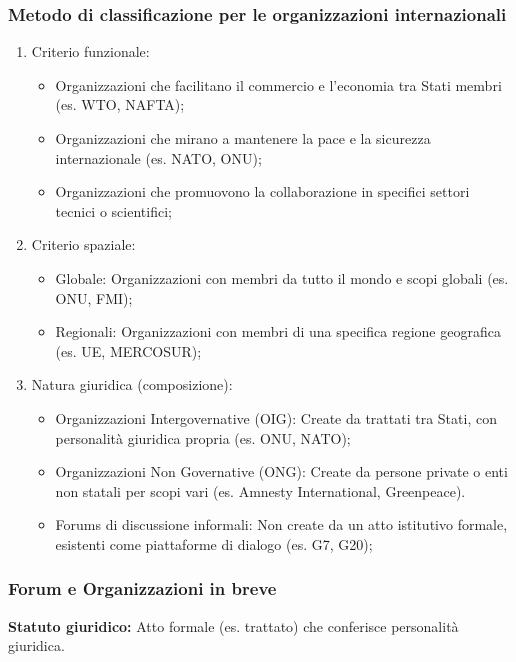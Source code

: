 \documentclass{article}
\begin{document}
\subsubsection{Metodo di classificazione per le organizzazioni internazionali}
\begin{enumerate}
    \item Criterio funzionale:
        \begin{itemize}
            \item Organizzazioni che facilitano il commercio e l'economia tra Stati membri
                (es. WTO, NAFTA);
            \item Organizzazioni che mirano a mantenere la pace e la sicurezza internazionale
                (es. NATO, ONU);
            \item Organizzazioni che promuovono la collaborazione in specifici settori tecnici
                o scientifici;
        \end{itemize}
    \item Criterio spaziale:
        \begin{itemize}
            \item Globale: Organizzazioni con membri da tutto il mondo e scopi globali
                (es. ONU, FMI);
            \item Regionali: Organizzazioni con membri di una specifica regione geografica
                (es. UE, MERCOSUR);
        \end{itemize}
    \item Natura giuridica (composizione):
        \begin{itemize}
            \item Organizzazioni Intergovernative (OIG): Create da trattati tra Stati, con
                personalità giuridica propria (es. ONU, NATO);
            \item Organizzazioni Non Governative (ONG): Create da persone private o enti non
                statali per scopi vari (es. Amnesty International, Greenpeace).
            \item Forums di discussione informali: Non create da un atto istitutivo formale,
                esistenti come piattaforme di dialogo (es. G7, G20);
        \end{itemize}
\end{enumerate}

\subsubsection{Forum e Organizzazioni in breve}
\textbf{Statuto giuridico:} Atto formale (es. trattato) che conferisce personalità giuridica.
\end{document}

